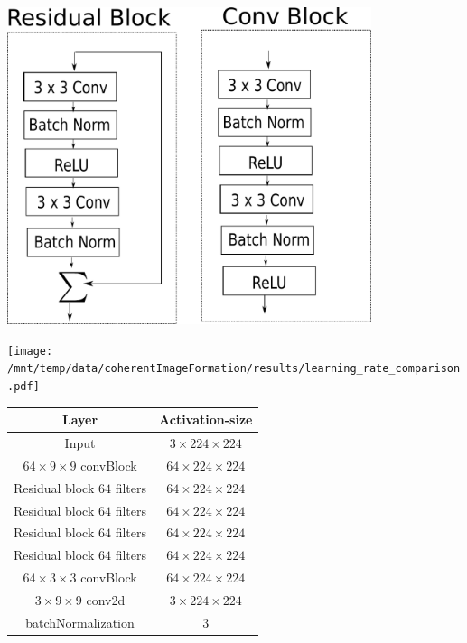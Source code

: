 \documentclass[a4paper, 11pt]{article}
\begin{document}
\begin{minipage}{\textwidth}
  \begin{minipage}[b]{0.45\textwidth}
    \centering
\includegraphics[width=0.8\textwidth]{../Figures/residualConvBlock.pdf}
  \label{residualConvBlock}
  \end{minipage}
  \hfill
  \begin{minipage}[b]{0.45\textwidth}
    \centering
\texttt{[image: /mnt/temp/data/coherentImageFormation/results/learning\_rate\_comparison.pdf]}
  \label{fig:learningRate}
  \end{minipage}
  \end{minipage}
\begin{table}[h]
\centering
\begin{tabular}{ | c | c |}
    \hline
    Layer & Activation-size  \\ \hline
    Input & $3\times 224 \times 224$  \\ \hline
    $64 \times 9\times 9$ convBlock & $64 \times 224 \times 224$  \\ \hline
    Residual block $64$ filters& $64 \times 224 \times 224$  \\ \hline
    Residual block $64$ filters& $64 \times 224 \times 224$  \\ \hline
    Residual block $64$ filters& $64 \times 224 \times 224$  \\ \hline
    Residual block $64$ filters& $64 \times 224 \times 224$  \\ \hline
    $64 \times 3 \times 3$ convBlock & $64 \times 224 \times 224$  \\ \hline
    $3 \times 9\times 9$ conv2d & $3 \times 224 \times 224$  \\ \hline
    batchNormalization & $3$  \\ \hline
    \end{tabular}
\label{networkArch}
\end{table}
\end{document}
